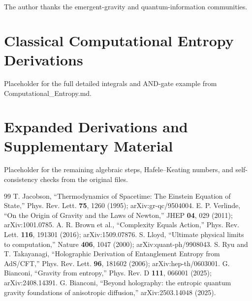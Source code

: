\documentclass[reprint,amsmath,amssymb,aps,prd,preprintnumbers,superscriptaddress,longbibliography,10pt]{revtex4-2}
\begin{document}
\begin{acknowledgments}
The author thanks the emergent-gravity and quantum-information communities.
\end{acknowledgments}

\appendix
\section{Classical Computational Entropy Derivations}
Placeholder for the full detailed integrals and AND-gate example from Computational\_Entropy.md.

\section{Expanded Derivations and Supplementary Material}
Placeholder for the remaining algebraic steps, Hafele--Keating numbers, and self-consistency checks from the original files.


\begin{thebibliography}{99}
 T. Jacobson, ``Thermodynamics of Spacetime: The Einstein Equation of State,'' Phys. Rev. Lett. \textbf{75}, 1260 (1995); arXiv:gr-qc/9504004.
 E. P. Verlinde, ``On the Origin of Gravity and the Laws of Newton,'' JHEP \textbf{04}, 029 (2011); arXiv:1001.0785.
 A. R. Brown et al., ``Complexity Equals Action,'' Phys. Rev. Lett. \textbf{116}, 191301 (2016); arXiv:1509.07876.
 S. Lloyd, ``Ultimate physical limits to computation,'' Nature \textbf{406}, 1047 (2000); arXiv:quant-ph/9908043.
 S. Ryu and T. Takayanagi, ``Holographic Derivation of Entanglement Entropy from AdS/CFT,'' Phys. Rev. Lett. \textbf{96}, 181602 (2006); arXiv:hep-th/0603001.
 G. Bianconi, ``Gravity from entropy,'' Phys. Rev. D \textbf{111}, 066001 (2025); arXiv:2408.14391.
 G. Bianconi, ``Beyond holography: the entropic quantum gravity foundations of anisotropic diffusion,'' arXiv:2503.14048 (2025).
\end{thebibliography}
\end{document}
